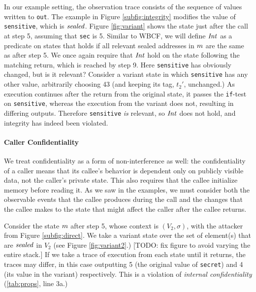 \documentclass[10pt,conference]{ieeetran}%
\theoremstyle{definition}
\begin{document}
In our example setting, the observation trace consists of the sequence
of values written to {\tt out}.
The example in Figure \ref{subfig:integrity} modifies the value of {\tt sensitive},
which is \(\mathit{sealed}\). Figure \ref{fig:variant} shows the state just after the call at step 5,
assuming that {\tt sec} is 5. Similar to WBCF, we will define
\(\mathit{Int}\) as a predicate on states that holds if
all relevant sealed addresses in \(m\) are the same as after step 5.
We once again require that \(\mathit{Int}\) hold on the state following the matching return,
which is reached by step 9. Here {\tt sensitive} has obviously changed, but is it relevant?
Consider a variant state in which {\tt sensitive} has any other value, arbitrarily
choosing 43 (and keeping its tag, \(t_2'\), unchanged.) As execution continues after the return
from the original state, it passes the {\tt if}-test on {\tt sensitive}, whereas the execution
from the variant does not, resulting in differing outputs. Therefore {\tt sensitive} \emph{is} relevant,
so \(\mathit{Int}\) does not hold, and integrity has indeed been violated.

\paragraph*{Caller Confidentiality}

We treat confidentiality as a form of non-interference as well: the confidentiality of a caller
means that its callee's behavior is dependent only on publicly visible data,
not the caller's private state. This also requires that the callee initialize
memory before reading it.
As we saw in the examples, we must consider both the observable events
that the callee produces during the call and the changes that the callee makes to the state that might
affect the caller after the callee returns.

Consider the state \(m\) after step 5, whose context is \((V_2,\sigma)\), with the attacker from
Figure \ref{subfig:direct}. We take a variant state over the set of element(s) that are
\(\mathit{sealed}\) in \(V_2\) (see Figure \ref{fig:variant2}.)
            [TODO: fix figure to avoid varying the entire stack.]
If we take a trace of execution from each state until it returns,
the traces may differ, in this case outputting 5 (the original value of {\tt secret}) and
4 (its value in the variant) respectively. This is a violation of
{\it internal confidentiality} (\cref{tab:props}, line 3a.)
\end{document}
